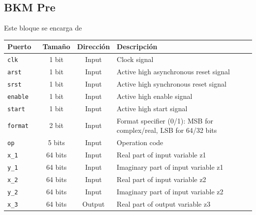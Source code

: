 \documentclass[10pt,a4paper]{book}
\begin{document}
      \subsection{BKM Pre}
      Este bloque se encarga de 
      \begin{table}[h]
      \centering
      \begin{tabular}{lccl}
         \hline
         Puerto            &  Tama\~no    &  Direcci\'on    &  Descripci\'on                                                  \\ \hline \hline
         \verb|clk      |  &  1  bit      &  Input          &  Clock signal                                                   \\ \hline
         \verb|arst     |  &  1  bit      &  Input          &  Active high asynchronous reset signal                          \\ \hline
         \verb|srst     |  &  1  bit      &  Input          &  Active high synchronous reset signal                           \\ \hline
         \verb|enable   |  &  1  bit      &  Input          &  Active high enable signal                                      \\ \hline
         \verb|start    |  &  1  bit      &  Input          &  Active high start signal                                       \\ \hline
         \verb|format   |  &  2  bit      &  Input          &  Format specifier (0/1): MSB for complex/real, LSB for 64/32 bits\\ \hline
         \verb|op       |  &  5  bits     &  Input          &  Operation code                                                 \\ \hline
         \verb|x_1      |  &  64 bits     &  Input          &  Real      part of input variable z1                            \\ \hline
         \verb|y_1      |  &  64 bits     &  Input          &  Imaginary part of input variable z1                            \\ \hline
         \verb|x_2      |  &  64 bits     &  Input          &  Real      part of input variable z2                            \\ \hline
         \verb|y_2      |  &  64 bits     &  Input          &  Imaginary part of input variable z2                            \\ \hline
         \verb|x_3      |  &  64 bits     &  Output         &  Real      part of output variable z3                           \\ \hline

\end{tabular}
\end{table}
\end{document}
